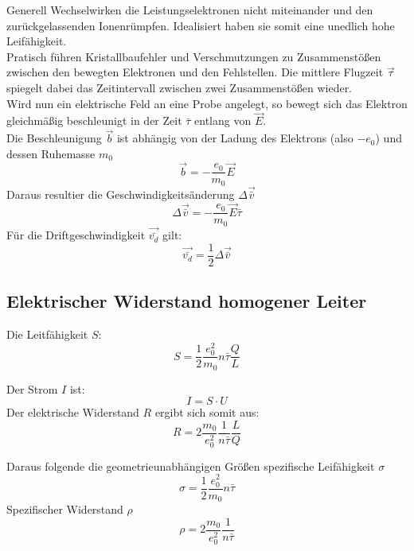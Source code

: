 Generell Wechselwirken die Leistungselektronen nicht miteinander und den zurückgelassenden Ionenrümpfen.
Idealisiert haben sie somit eine unedlich hohe Leifähigkeit.\\
Pratisch führen Kristallbaufehler und Verschmutzungen zu Zusammenstößen zwischen den bewegten Elektronen und den Fehlstellen.
Die mittlere Flugzeit $\vec{\tau}$ spiegelt dabei das Zeitintervall zwischen zwei Zusammenstößen wieder.\\
Wird nun ein elektrische Feld an eine Probe angelegt, so bewegt sich das Elektron gleichmäßig beschleunigt in der Zeit $\bar{\tau}$
entlang von $\vec{E}$.\\
Die Beschleunigung $\vec{b}$ ist abhängig von der Ladung des Elektrons (also $-e_0$) und dessen Ruhemasse $m_0$ 
\begin{equation}
    \vec{b}=-\frac{e_0}{m_0}\vec{E}
\end{equation}
Daraus resultier die Geschwindigkeitsänderung $\Delta \vec{\bar{v}}$
\begin{equation}
    \Delta \vec{\bar{v}}=-\frac{e_0}{m_0}\vec{E}\bar{\tau}
\end{equation}
Für die Driftgeschwindigkeit $\vec{\bar{v_d}}$ gilt:
\begin{equation}
    \vec{\bar{v_d}}=\frac{1}{2} \Delta \vec{\bar{v}}
\end{equation}

\subsection{Elektrischer Widerstand homogener Leiter}
Die Leitfähigkeit $S$:
\begin{equation}
    S=\frac{1}{2}\frac{e_0^2}{m_0}n\bar{\tau}\frac{Q}{L}
\end{equation}

Der Strom $I$ ist:
\begin{equation}
    I=S \cdot U
\end{equation}
Der elektrische Widerstand $R$ ergibt sich somit aus:
\begin{equation}
    R=2\frac{m_0}{e_0^2}\frac{1}{n\bar{\tau}}\frac{L}{Q}
\end{equation}

Daraus folgende die geometrieunabhängigen Größen
spezifische Leifähigkeit $\sigma$
\begin{equation}
    \sigma = \frac{1}{2}\frac{e_0^2}{m_0}n\bar{\tau}
\end{equation}
Spezifischer Widerstand $\rho$
\begin{equation}
    \rho = 2 \frac{m_0}{e_0^2}\frac{1}{n\bar{\tau}}
\end{equation}






